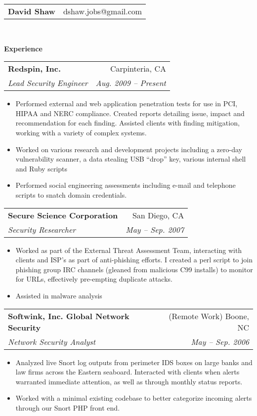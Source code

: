 \documentclass[letterpaper,11pt]{article}
\makeatletter
\newcommand{\resitem}[1]{\item #1 \vspace{-2pt}}
\newcommand{\resheading}[1]{{\large \colorbox{mygrey}{\begin{minipage}{\textwidth}{\textbf{#1 \vphantom{p\^{E}}}}\end{minipage}}}}
\newcommand{\ressubheading}[4]{
\begin{tabular*}{6.5in}{l@{\extracolsep{\fill}}r}
		\textbf{#1} & #2 \\
		\textit{#3} & \textit{#4} \\
\end{tabular*}\vspace{-6pt}}
\makeatother
\begin{document}
\thispagestyle{empty}
\newcommand{\mywebheader}{
\begin{tabular*}{7in}{l@{\extracolsep{\fill}}r}
	\textbf{{\LARGE David Shaw}} & {dshaw.jobs@gmail.com}
	\end{tabular*}
\\
\vspace{0.1in}}

\mywebheader

\resheading{Experience}
	\begin{description}
	\item\ressubheading{{Redspin, Inc.}}{Carpinteria, CA}{Lead Security Engineer}{Aug. 2009 -- Present}
				{ \footnotesize
				\begin{itemize}
					\resitem{Performed external and web application penetration tests for use in PCI, HIPAA and NERC compliance. Created reports detailing issue, impact and recommendation for each finding. Assisted clients with finding mitigation, working with a variety of complex systems.}
					\resitem{Worked on various research and development projects including a zero-day vulnerability scanner, a data stealing USB ``drop'' key, various internal shell and Ruby scripts}
					\resitem{Performed social engineering assessments including e-mail and telephone scripts to snatch domain credentials.}
				\end{itemize}
				}
	\item\ressubheading{{Secure Science Corporation}}{San Diego, CA}{Security Researcher}{May -- Sep. 2007}
				{ \footnotesize
				\begin{itemize}
					\resitem{Worked as part of the External Threat Assessment Team, interacting with clients and ISP's as part of anti-phishing efforts. I created a perl script to join phishing group IRC channels (gleaned from malicious C99 installs) to monitor for URLs, effectively pre-empting duplicate attacks.}
					\resitem{Assisted in malware analysis}
				\end{itemize}
          			}
	\item\ressubheading{{Softwink, Inc. Global Network Security}}{(Remote Work) Boone, NC}{Network Security Analyst}{May -- Sep. 2006}
				{ \footnotesize
				\begin{itemize}
					\resitem{Analyzed live Snort log outputs from perimeter IDS boxes on large banks and law firms across the Eastern seaboard. Interacted with clients when alerts warranted immediate attention, as well as through monthly status reports.}
					\resitem{Worked with a minimal existing codebase to better categorize incoming alerts through our Snort PHP front end.}

\end{itemize}}
\end{description}
\end{document}
